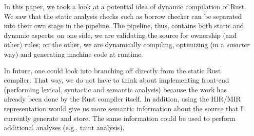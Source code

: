 In this paper, we took a look at a potential idea of dynamic compilation of
Rust. We saw that the static analysis checks such as borrow checker can be
separated into their own stage in the pipeline. The pipeline, thus, contains
both static and dynamic aspects: on one side, we are validating the source for
ownership (and other) rules; on the other, we are dynamically compiling,
optimizing (in a \textit{smarter} way) and generating machine code at runtime.

In future, one could look into branching off directly from the static Rust
compiler.  That way, we do not have to think about implementing front-end
(performing lexical, syntactic and semantic analysis) because the work has
already been done by the Rust compiler itself. In addition, using the HIR/MIR
representation would give us more semantic information about the source that I
currently generate and store. The same information could be used to perform
additional analyses (e.g., taint analysis).
